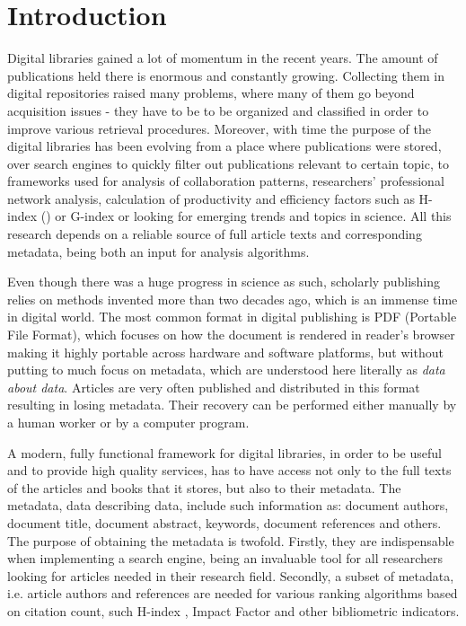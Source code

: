 \chapter{Introduction}
Digital libraries gained a lot of momentum in the recent years. The amount of publications held there is enormous and constantly growing. Collecting them in digital repositories raised many problems, where many of them go beyond acquisition issues - they have to be to be organized and classified in order to improve various retrieval procedures. Moreover, with time the purpose of the digital libraries has been evolving from a place where publications were stored, over search engines to quickly filter out publications relevant to certain topic, to frameworks used for analysis of collaboration patterns, researchers' professional network analysis, calculation of productivity and efficiency factors such as H-index (\cite{Hirsch}) or G-index or looking for emerging trends and topics in science.
All this research depends on a reliable source of full article texts and corresponding metadata, being both an input for analysis algorithms.

Even though there was a huge progress in science as such, scholarly publishing relies on methods invented more than two decades ago, which is an immense time in digital world. The most common format in digital publishing is PDF (Portable File Format), which focuses on how the document is rendered in reader's browser making it highly portable across hardware and software platforms, but without putting to much focus on metadata, which are understood here literally as \textit{data about data}. Articles are very often published and distributed in this format resulting in losing metadata. Their recovery can be performed either manually by a human worker or by a computer program. 

A modern, fully functional framework for digital libraries, in order to be useful and to provide high quality services, has to have access not only to the full texts of the articles and books that it stores, but also to their metadata. The metadata, data describing data, include such information as: document authors, document title, document abstract, keywords, document references and others. The purpose of obtaining the metadata is twofold. Firstly, they are indispensable when implementing a search engine, being an invaluable tool for all researchers looking for articles needed in their research field. Secondly, a subset of metadata, i.e. article authors and references are needed for various ranking algorithms based on citation count, such H-index \cite{Hirsch}, Impact Factor and other bibliometric indicators.

